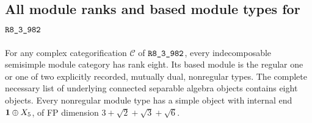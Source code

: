 \subsection{All module ranks and based module types for
\texorpdfstring{$\sha{R8_3_982}$}{R8-3-982}}
\label{subsec:research-r982-module-types}

\begin{theorem}
\label{thm:research-r982-modules}
For any complex categorification $\mathcal C$ of $\sha{R8_3_982}$,
every indecomposable semisimple module category has rank eight.
Its based module is the regular one or one of two explicitly recorded,
mutually dual, nonregular types.  The complete necessary list of
underlying connected separable algebra objects contains eight
objects.  Every nonregular module type has a simple object with
internal end $\mathbf1\oplus X_5$, of FP dimension
$3+\sqrt2+\sqrt3+\sqrt6$.
\end{theorem}
